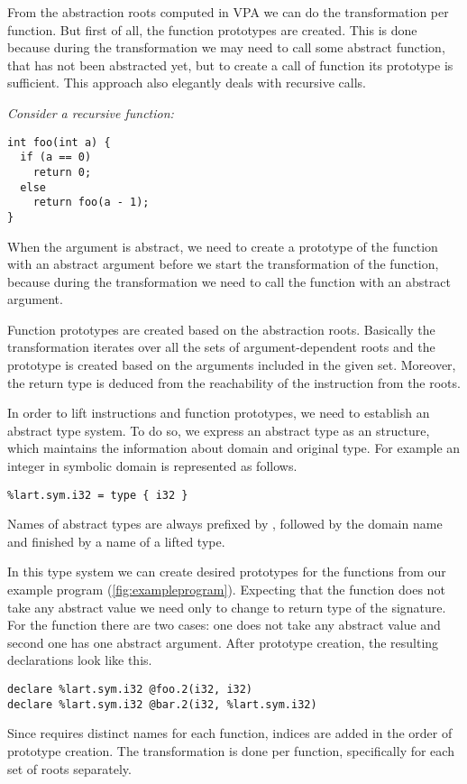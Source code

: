 From the abstraction roots computed in VPA we can do the transformation per
function. But first of all, the function prototypes are created. This is done
because during the transformation we may need to call some abstract function,
that has not been abstracted yet, but to create a call of function its prototype
is sufficient. This approach also elegantly deals with recursive calls.
\begin{marginfigure}
\itshape
Consider a recursive function:
\begin{verbatim}
int foo(int a) {
  if (a == 0)
    return 0;
  else
    return foo(a - 1);
}
\end{verbatim}
    When the argument  is abstract, we need to create a prototype of
    the function  with an abstract argument before we start the
    transformation of the function, because during the transformation we need to
    call the function  with an abstract argument.
\end{marginfigure}

Function prototypes are created based on the abstraction roots. Basically
the transformation iterates over all the sets of argument-dependent roots and
the prototype is created based on the arguments included in the given set.
Moreover, the return type is deduced from the reachability of the  instruction
from the roots.

In order to lift \LLVM instructions and function prototypes, we need to
establish an abstract type system. To do so, we express an abstract type as an
\LLVM structure, which maintains the information about domain and original
type. For example an integer in symbolic domain is represented as follows.

\begin{verbatim}
%lart.sym.i32 = type { i32 }
\end{verbatim}

Names of abstract types are always prefixed by , followed by the
domain name and finished by a name of a lifted \LLVM type.

In this type system we can create desired prototypes for the functions from our
example program (\autoref{fig:exampleprogram}). Expecting that the function 
does not take any abstract value we need only to change to return type of the
signature. For the function  there are two cases: one does not take any
abstract value and second one has one abstract argument. After prototype
creation, the resulting \LLVM declarations look like this.
\begin{verbatim}
declare %lart.sym.i32 @foo.2(i32, i32)
declare %lart.sym.i32 @bar.2(i32, %lart.sym.i32)
\end{verbatim}
Since \LLVM requires distinct names for each function, indices are added in
the order of prototype creation. The transformation is done per function,
specifically for each set of roots separately.

